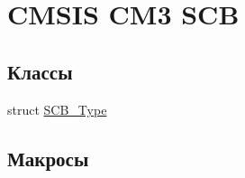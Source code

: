 \hypertarget{group___c_m_s_i_s___c_m3___s_c_b}{}\section{C\+M\+S\+IS C\+M3 S\+CB}
\label{group___c_m_s_i_s___c_m3___s_c_b}
\subsection*{Классы}
\begin{DoxyCompactItemize}
\item 
struct \mbox{\hyperlink{struct_s_c_b___type}{S\+C\+B\+\_\+\+Type}}
\end{DoxyCompactItemize}
\subsection*{Макросы}
